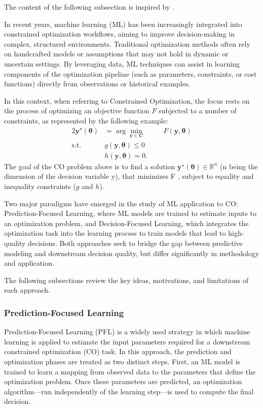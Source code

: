 The content of the following subsection is inspired by \cite{mandiDecisionFocusedLearningFoundations2024}.

In recent years, machine learning (ML) has been increasingly integrated into constrained optimization workflows, aiming to improve decision-making in complex, structured environments. Traditional optimization methods often rely on handcrafted models or assumptions that may not hold in dynamic or uncertain settings. By leveraging data, ML techniques can assist in learning components of the optimization pipeline (such as parameters, constraints, or cost functions) directly from observations or historical examples.

In this context, when referring to Constrained Optimization, the focus rests on the process of optimizing an objective function \(F\) subjected to a number of constraints, as represented by the following example:
\begin{alignat}{2}
    \mathbf{y}^\star(\mathbf{\theta}) &= \arg\min_{\mathbf{y \in C}} \quad &&F(\mathbf{y}, \mathbf{\theta}) \tag{2a} \\
    \text{s.t.} \quad &g(\mathbf{y}, \mathbf{\theta}) \leq 0 \quad &&\tag{2b} \\
    &h(\mathbf{y}, \mathbf{\theta}) = 0. &&\tag{2c}
\end{alignat}
The goal of the CO problem above is to find a solution \(\mathbf{y}^\star(\mathbf{\theta}) \in \mathbb{R}^n\) (n being the dimension of the decision variable y), that minimizes F , subject to equality and inequality constraints (\(g\) and \(h\)).

Two major paradigms have emerged in the study of ML application to CO: Prediction-Focused Learning, where ML models are trained to estimate inputs to an optimization problem, and Decision-Focused Learning, which integrates the optimization task into the learning process to train models that lead to high-quality decisions. Both approaches seek to bridge the gap between predictive modeling and downstream decision quality, but differ significantly in methodology and application.

The following subsections review the key ideas, motivations, and limitations of each approach.

\subsubsection{Prediction-Focused Learning}

Prediction-Focused Learning (PFL) is a widely used strategy in which machine learning is applied to estimate the input parameters required for a downstream constrained optimization (CO) task. In this approach, the prediction and optimization phases are treated as two distinct steps. First, an ML model is trained to learn a mapping from observed data to the parameters that define the optimization problem. Once these parameters are predicted, an optimization algorithm—run independently of the learning step—is used to compute the final decision.

